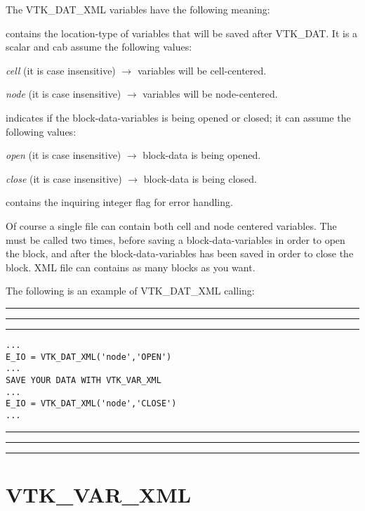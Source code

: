 \documentclass[pagesize=pdftex,fontsize=10pt,paper=a4,oneside]{scrbook}
\DeclareRobustCommand{\MarginNote}[1]{\marginpar{%
\slshape\footnotesize%
\parindent=0pt\lineskip=0pt\lineskiplimit=0pt%
\tolerance=2000\hyphenpenalty=300\exhyphenpenalty=300%
\doublehyphendemerits=100000\finalhyphendemerits=\doublehyphendemerits%
\raggedright\hspace{0pt}#1}}
\newenvironment{boxred}[1]%
               {%
                \noindent\hspace*{-0.025\textwidth}%
                \color{Maroon}%
                \rule[-5.8pt]{0.6pt}{6pt}\hspace*{-0.6pt}\rule{1.05\textwidth}{0.6pt}\hspace*{-0.6pt}\rule[-5.8pt]{0.6pt}{6pt}%
                \color{black}%
                \vspace*{0.6pt}\MarginNote{\color{Maroon}{#1}}%
               }%
               {%
                \noindent\hspace*{-0.025\textwidth}%
                \color{Maroon}%
                \rule[0pt]{0.6pt}{6pt}\hspace*{-0.6pt}\rule{1.05\textwidth}{0.6pt}\hspace*{-0.6pt}\rule[0pt]{0.6pt}{6pt}%
                \color{black}%
                \vspace*{2mm}%
               }
\newenvironment{enumerateABlu}%
{\def\theenumi{\textsc{\EnumFont\color{RoyalBlue}\Alph{enumi}}}%
\enumerate}%
{\endenumerate}
\DeclareRobustCommand{\MaiuscolettoBS}[1]{\textls[80]{\scshape\MakeTextLowercase{#1}}}
\begin{document}
The VTK\_DAT\_XML variables have the following meaning:

\begin{description}
\item[{\color{RoyalBlue}var\_location}] contains the location-type of variables that will be saved after VTK\_DAT.
It is a scalar and cab assume the following values:
 \begin{enumerateABlu}
  \item \emph{cell} (it is case insensitive) $\rightarrow$ variables will be cell-centered.
  \item \emph{node} (it is case insensitive) $\rightarrow$ variables will be node-centered.
 \end{enumerateABlu}
 \item[{\color{RoyalBlue}var\_block\_action}] indicates if the block-data-variables is being opened or closed; it can
                                              assume the following values:
 \begin{enumerateABlu}
  \item \emph{open}  (it is case insensitive) $\rightarrow$ block-data is being opened.
  \item \emph{close} (it is case insensitive) $\rightarrow$ block-data is being closed.
 \end{enumerateABlu}
 \item[{\color{RoyalBlue}E\_IO}] contains the inquiring integer flag for error handling.
\end{description}

Of course a single file can contain both cell and node centered variables. The \MaiuscolettoBS{VTK\_DAT\_XML} must be
called two times, before saving a block-data-variables in order to open the block, and after the block-data-variables
has been saved in order to close the block. XML file can contains as many blocks as you want.

The following is an example of VTK\_DAT\_XML calling:

\begin{boxred}{VTK\_DAT\_XML Calling}
\begin{verbatim}
...
E_IO = VTK_DAT_XML('node','OPEN')
...
SAVE YOUR DATA WITH VTK_VAR_XML
...
E_IO = VTK_DAT_XML('node','CLOSE')
...
\end{verbatim}
\end{boxred}


\section{VTK\_VAR\_XML}
\end{document}
